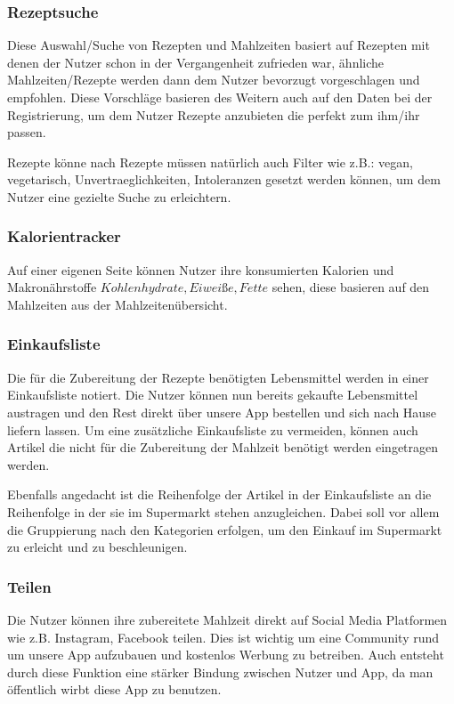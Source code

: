 \documentclass[12pt]{article}
\theoremstyle{definition}
\begin{document}
\subsubsection{Rezeptsuche}
Diese Auswahl/Suche von Rezepten und Mahlzeiten basiert auf Rezepten mit denen der Nutzer schon in der Vergangenheit zufrieden war, ähnliche Mahlzeiten/Rezepte werden dann dem Nutzer bevorzugt vorgeschlagen und empfohlen. Diese Vorschläge basieren des Weitern auch auf den Daten bei der Registrierung, um dem Nutzer Rezepte anzubieten die perfekt zum ihm/ihr passen.

Rezepte könne
nach Rezepte müssen natürlich auch Filter wie z.B.: vegan, vegetarisch, Unvertraeglichkeiten, Intoleranzen gesetzt werden können, um dem Nutzer eine gezielte Suche zu erleichtern. 

\subsubsection{Kalorientracker}
Auf einer eigenen Seite können Nutzer ihre konsumierten Kalorien und Makronährstoffe \(Kohlenhydrate, Eiweiße, Fette\) sehen, diese basieren auf den Mahlzeiten aus der Mahlzeitenübersicht.

\subsubsection{Einkaufsliste}
Die für die Zubereitung der Rezepte benötigten Lebensmittel werden in einer Einkaufsliste notiert. Die Nutzer können nun bereits gekaufte Lebensmittel austragen und den Rest direkt über unsere App bestellen und sich nach Hause liefern lassen. Um eine zusätzliche Einkaufsliste zu vermeiden, können auch Artikel die nicht für die Zubereitung der Mahlzeit benötigt werden eingetragen werden. 

Ebenfalls angedacht ist die Reihenfolge der Artikel in der Einkaufsliste an die Reihenfolge in der sie im Supermarkt stehen anzugleichen. Dabei soll vor allem die Gruppierung nach den Kategorien erfolgen, um den Einkauf im Supermarkt zu erleicht und zu beschleunigen.

\subsubsection{Teilen}
Die Nutzer können ihre zubereitete Mahlzeit direkt auf Social Media Platformen wie z.B. Instagram, Facebook teilen. Dies ist wichtig um eine Community rund um unsere App aufzubauen und kostenlos Werbung zu betreiben. Auch entsteht durch diese Funktion eine stärker Bindung zwischen Nutzer und App, da man öffentlich wirbt diese App zu benutzen.
\end{document}
